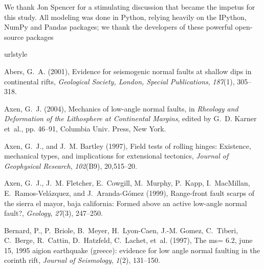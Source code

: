 \documentclass[twocolumn,grl]{AGUTeX}
\begin{document}
\begin{article}
\begin{acknowledgements}
  We thank Jon Spencer for a stimulating discussion that became the
  impetus for this study.  All modeling was done in Python, relying heavily
  on the IPython, NumPy and Pandas packages; we thank the developers of these 
  powerful open-source packages
\end{acknowledgements}

\begin{thebibliography}{29}
\providecommand{\natexlab}[1]{#1}
\expandafter\ifx\csname urlstyle\endcsname\relax
  \providecommand{\doi}[1]{doi:\discretionary{}{}{}#1}\else
  \providecommand{\doi}{doi:\discretionary{}{}{}\begingroup
  \urlstyle{rm}\Url}\fi

Abers, G.~A. (2001), Evidence for seismogenic normal faults at shallow dips in
  continental rifts, \textit{Geological Society, London, Special Publications},
  \textit{187}(1), 305--318.

Axen, G.~J. (2004), Mechanics of low-angle normal faults, in \textit{Rheology
  and Deformation of the Lithosphere at Continental Margins}, edited by G.~D.
  Karner et~al., pp. 46--91, Columbia Univ. Press, New York.

Axen, G.~J., and J.~M. Bartley (1997), Field tests of rolling hinges:
  Existence, mechanical types, and implications for extensional tectonics,
  \textit{Journal of Geophysical Research}, \textit{102}(B9), 20,515--20.

Axen, G.~J., J.~M. Fletcher, E.~Cowgill, M.~Murphy, P.~Kapp, I.~MacMillan,
  E.~Ramos-Vel{\'a}zquez, and J.~Aranda-G{\'o}mez (1999), Range-front fault
  scarps of the sierra el mayor, baja california: Formed above an active
  low-angle normal fault?, \textit{Geology}, \textit{27}(3), 247--250.

Bernard, P., P.~Briole, B.~Meyer, H.~Lyon-Caen, J.-M. Gomez, C.~Tiberi,
  C.~Berge, R.~Cattin, D.~Hatzfeld, C.~Lachet, et~al. (1997), The ms= 6.2, june
  15, 1995 aigion earthquake (greece): evidence for low angle normal faulting
  in the corinth rift, \textit{Journal of Seismology}, \textit{1}(2), 131--150.


\end{thebibliography}
\end{article}
\end{document}
